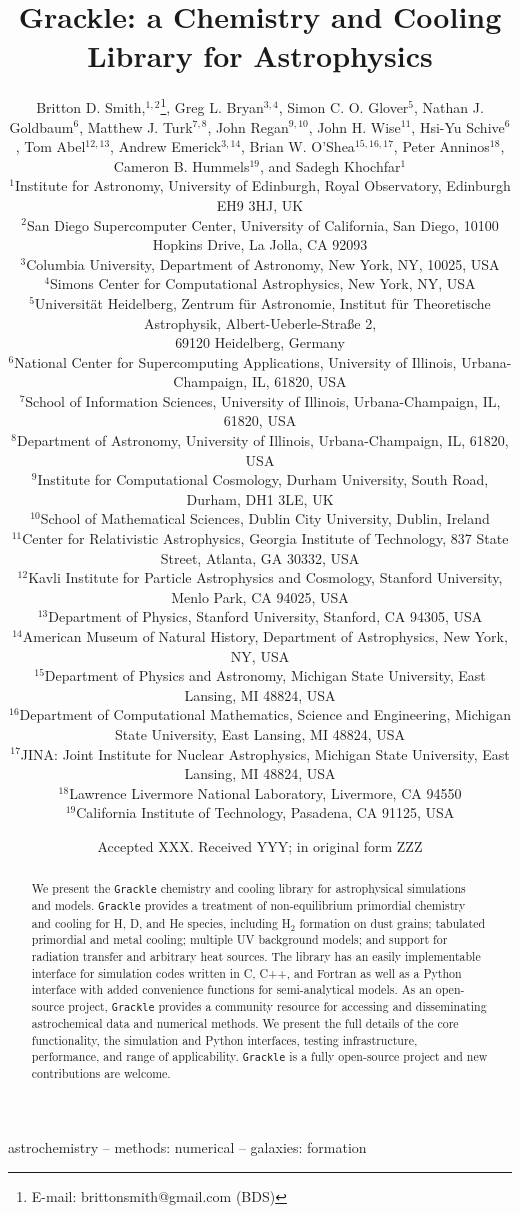 \documentclass[a4paper,fleqn,usenatbib]{mnras}
\title[Grackle]{Grackle: a Chemistry and Cooling
  Library for Astrophysics}
\author[B.D. Smith et al.]
       {Britton D. Smith,$^{1,2}$\thanks{E-mail: brittonsmith@gmail.com
           (BDS)},
        Greg L. Bryan$^{3,4}$,
        Simon C. O. Glover$^{5}$,
        Nathan J. Goldbaum$^{6}$, \newauthor
        Matthew J. Turk$^{7,8}$,
        John Regan$^{9,10}$,
        John H. Wise$^{11}$,
        Hsi-Yu Schive$^{6}$,
        Tom Abel$^{12,13}$, \newauthor
        Andrew Emerick$^{3,14}$,
        Brian W. O'Shea$^{15,16,17}$,
        Peter Anninos$^{18}$, \newauthor
        Cameron B. Hummels$^{19}$,
        and Sadegh Khochfar$^{1}$\\
$^{1}$Institute for Astronomy, University of Edinburgh, Royal
Observatory, Edinburgh EH9 3HJ, UK\\
$^{2}$San Diego Supercomputer Center, University of California, San Diego,
10100 Hopkins Drive, La Jolla, CA 92093\\
$^{3}$Columbia University, Department of Astronomy, New York, NY,
10025, USA\\
$^{4}$Simons Center for Computational Astrophysics, New York, NY,
USA\\
$^{5}$Universit\"{a}t Heidelberg, Zentrum f\"{u}r Astronomie, Institut
f\"{u}r Theoretische Astrophysik, Albert-Ueberle-Stra{\ss}e 2, \\69120
Heidelberg, Germany\\
$^{6}$National Center for Supercomputing Applications, University of
Illinois, Urbana-Champaign, IL, 61820, USA\\
$^{7}$School of Information Sciences, University of Illinois,
Urbana-Champaign, IL, 61820, USA\\
$^{8}$Department of Astronomy, University of Illinois,
Urbana-Champaign, IL, 61820, USA\\
$^{9}$Institute for Computational Cosmology, Durham University, South
Road, Durham, DH1 3LE, UK \\
$^{10}$School of Mathematical Sciences, Dublin City University, Dublin,
Ireland \\
$^{11}$Center for Relativistic Astrophysics, Georgia Institute of
Technology, 837 State Street, Atlanta, GA 30332, USA\\
$^{12}$Kavli Institute for Particle Astrophysics and Cosmology,
Stanford University, Menlo Park, CA 94025, USA\\
$^{13}$Department of Physics, Stanford University, Stanford, CA 94305,
USA\\
$^{14}$American Museum of Natural History, Department of Astrophysics,
New York, NY, USA\\
$^{15}$Department of Physics and Astronomy, Michigan State University,
East Lansing, MI 48824, USA\\
$^{16}$Department of Computational Mathematics, Science and
Engineering, Michigan State University, East Lansing, MI 48824, USA\\
$^{17}$JINA: Joint Institute for Nuclear Astrophysics, Michigan State
University, East Lansing, MI 48824, USA\\
$^{18}$Lawrence Livermore National Laboratory, Livermore, CA 94550\\
$^{19}$California Institute of Technology, Pasadena, CA 91125, USA\\
}
\date{Accepted XXX. Received YYY; in original form ZZZ}
\begin{document}
\label{firstpage}
\pagerange{\pageref{firstpage}--\pageref{lastpage}}
\maketitle

\begin{abstract}
We present the \texttt{Grackle} chemistry and cooling library for
astrophysical simulations and models.  \texttt{Grackle} provides
a treatment of non-equilibrium primordial chemistry and cooling for H, D, and He
species, including H$_{2}$ formation on dust grains; tabulated
primordial and metal cooling; multiple UV background models; and
support for radiation transfer and arbitrary heat sources.  The
library has an easily implementable interface for simulation codes
written in C, C++, and Fortran as well as a Python interface with
added convenience functions for semi-analytical models.  As an
open-source project, \texttt{Grackle} provides a community resource
for accessing and disseminating astrochemical data and numerical
methods.  We present the full details of the core functionality, the
simulation and Python interfaces, testing infrastructure, performance,
and range of applicability.  \texttt{Grackle} is a fully open-source
project and new contributions are welcome.
\end{abstract}

\begin{keywords}
astrochemistry -- methods: numerical -- galaxies: formation
\end{keywords}

















\footnotesize{
  
  
}

\bsp
\label{lastpage}
\end{document}
